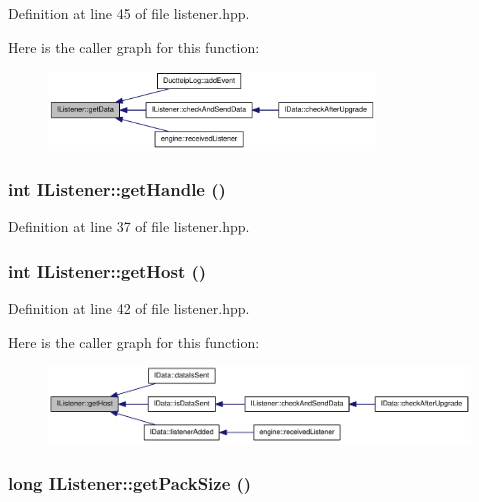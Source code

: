 Definition at line 45 of file listener.hpp.

Here is the caller graph for this function:\nopagebreak
\begin{figure}[H]
\begin{center}
\leavevmode
\includegraphics[width=246pt]{class_i_listener_a26d2796b0c0f2fb59203140ddb0ee468_icgraph}
\end{center}
\end{figure}
\hypertarget{class_i_listener_a740d5ab9a48bdb21b107edd813e8b9ca}{
\subsubsection[{getHandle}]{\setlength{\rightskip}{0pt plus 5cm}int IListener::getHandle ()}}
\label{class_i_listener_a740d5ab9a48bdb21b107edd813e8b9ca}


Definition at line 37 of file listener.hpp.\hypertarget{class_i_listener_a92be46f2fb958f6b52564e837d5fca98}{
\subsubsection[{getHost}]{\setlength{\rightskip}{0pt plus 5cm}int IListener::getHost ()}}
\label{class_i_listener_a92be46f2fb958f6b52564e837d5fca98}


Definition at line 42 of file listener.hpp.

Here is the caller graph for this function:\nopagebreak
\begin{figure}[H]
\begin{center}
\leavevmode
\includegraphics[width=317pt]{class_i_listener_a92be46f2fb958f6b52564e837d5fca98_icgraph}
\end{center}
\end{figure}
\hypertarget{class_i_listener_a8a3f4a3f3c27cd671415192b99b10a96}{
\subsubsection[{getPackSize}]{\setlength{\rightskip}{0pt plus 5cm}long IListener::getPackSize ()}}
\label{class_i_listener_a8a3f4a3f3c27cd671415192b99b10a96}



